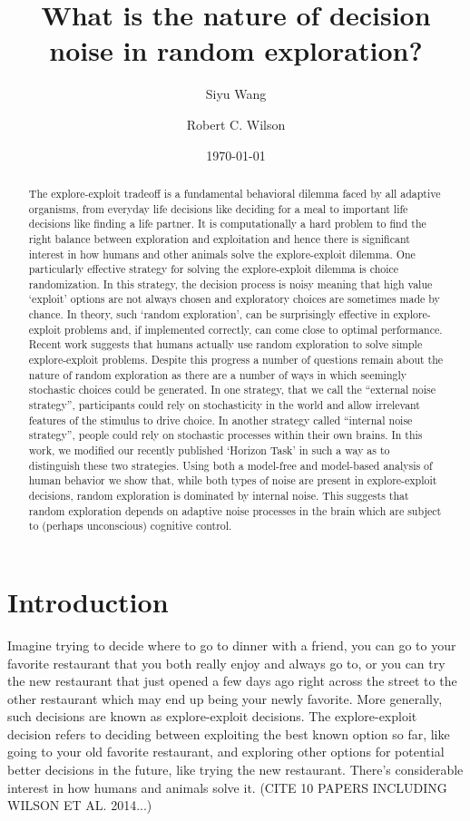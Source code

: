 \documentclass[12pt]{article}
\title{What is the nature of decision noise in random exploration?}
\author[1]{Siyu Wang}
\author[1,2]{Robert C. Wilson}
\affil[1]{Department of Psychology, University of Arizona, Tucson AZ USA}
\affil[2]{Cognitive Science Program, University of Arizona, Tucson AZ USA}
\date{\today}
\begin{document}
	\maketitle
	
	\newpage
	\begin{abstract}
		The explore-exploit tradeoff is a fundamental behavioral dilemma faced by all adaptive organisms, from everyday life decisions like deciding for a meal to important life decisions like finding a life partner. It is computationally a hard problem to find the right balance between exploration and exploitation and hence there is significant interest in how humans and other animals solve the explore-exploit dilemma. One particularly effective strategy for solving the explore-exploit dilemma is choice randomization.  In this strategy, the decision process is noisy meaning that high value `exploit' options are not always chosen and exploratory choices are sometimes made by chance. In theory, such `random exploration', can be surprisingly effective in explore-exploit problems and, if implemented correctly, can come close to optimal performance. Recent work suggests that humans actually use random exploration to solve simple explore-exploit problems. Despite this progress a number of questions remain about the nature of random exploration as there are a number of ways in which seemingly stochastic choices could be generated. In one strategy, that we call the “external noise strategy”, participants could rely on stochasticity in the world and allow irrelevant features of the stimulus to drive choice. In another strategy called “internal noise strategy”, people could rely on stochastic processes within their own brains. In this work, we modified our recently published `Horizon Task' in such a way as to distinguish these two strategies. Using both a model-free and model-based analysis of human behavior we show that, while both types of noise are present in explore-exploit decisions, random exploration is dominated by internal noise. This suggests that random exploration depends on adaptive noise processes in the brain which are subject to (perhaps unconscious) cognitive control. 
	\end{abstract}
	\newpage
	
	
	\section*{Introduction}
	
	Imagine trying to decide where to go to dinner with a friend, you can go to your favorite restaurant that you both really enjoy and always go to, or you can try the new restaurant that just opened a few days ago right across the street to the other restaurant which may end up being your newly favorite. More generally, such decisions are known as explore-exploit decisions. The explore-exploit decision refers to deciding between exploiting the best known option so far, like going to your old favorite restaurant, and exploring other options for potential better decisions in the future, like trying the new restaurant. There's considerable interest in how humans and animals solve it. (CITE 10 PAPERS INCLUDING WILSON ET AL. 2014...)
	
\end{document}
